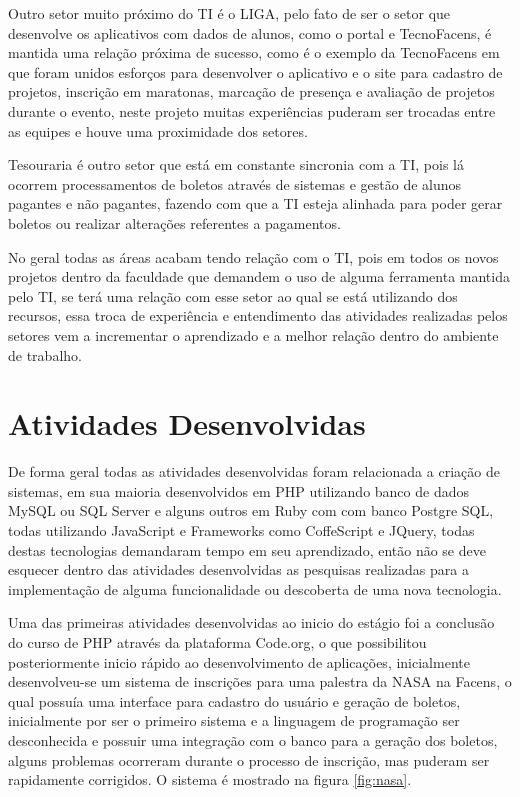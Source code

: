 \documentclass[
	12pt,				%
	oneside,			%
	a4paper,			%
	chapter=TITLE,		%
	section=TITLE,		%
	sumario=tradicional %
	english,			%
	french,				%
	spanish,			%
	brazil				%
	]{abntex2}
\begin{document}
Outro setor muito próximo do TI é o LIGA, pelo fato de ser o setor que desenvolve os aplicativos com dados de alunos, como o portal e TecnoFacens, é mantida uma relação próxima de sucesso, como é o exemplo da TecnoFacens em que foram unidos esforços para desenvolver o aplicativo e o site para cadastro de projetos, inscrição em maratonas, marcação de presença e avaliação de projetos durante o evento, neste projeto muitas experiências puderam ser trocadas entre as equipes e houve uma proximidade dos setores.

Tesouraria é outro setor que está em constante sincronia com a TI, pois lá ocorrem processamentos de boletos através de sistemas e gestão de alunos pagantes e não pagantes, fazendo com que a TI esteja alinhada para poder gerar boletos ou realizar alterações referentes a pagamentos.

No geral todas as áreas acabam tendo relação com o TI, pois em todos os novos projetos dentro da faculdade que demandem o uso de alguma ferramenta mantida pelo TI, se terá uma relação com esse setor ao qual se está utilizando dos recursos, essa troca de experiência e entendimento das atividades realizadas pelos setores vem a incrementar o aprendizado e a melhor relação dentro do ambiente de trabalho. 

\chapter{Atividades Desenvolvidas}
\label{chap:chap5}
De forma geral todas as atividades desenvolvidas foram relacionada a criação de sistemas, em sua maioria desenvolvidos em PHP utilizando banco de dados MySQL ou SQL Server e alguns outros em Ruby com com banco Postgre SQL, todas utilizando JavaScript e Frameworks como CoffeScript e JQuery, todas destas tecnologias demandaram tempo em seu aprendizado, então não se deve esquecer dentro das atividades desenvolvidas as pesquisas realizadas para a implementação de alguma funcionalidade ou descoberta de uma nova tecnologia.

Uma das primeiras atividades desenvolvidas ao inicio do estágio foi a conclusão do curso de PHP através da plataforma Code.org, o que possibilitou posteriormente inicio rápido ao desenvolvimento de aplicações, inicialmente desenvolveu-se um sistema de inscrições para uma palestra da NASA na Facens, o qual possuía uma interface para cadastro do usuário e geração de boletos, inicialmente por ser o primeiro sistema e a linguagem de programação ser desconhecida e possuir uma integração com o banco para a geração dos boletos, alguns problemas ocorreram durante o processo de inscrição, mas puderam ser rapidamente corrigidos. O sistema é mostrado na figura \ref{fig:nasa}.
\end{document}
